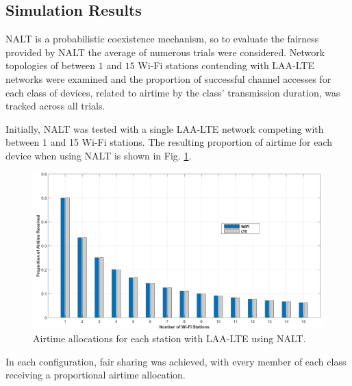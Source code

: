 \subsection{Simulation Results}
\label{sim-results}
NALT is a probabilistic coexistence mechanism, so to evaluate the fairness provided by NALT the average of numerous trials were considered.  Network topologies of between $1$ and $15$ \mbox{Wi-Fi} stations contending with \mbox{LAA-LTE} networks were examined and the proportion of successful channel accesses for each class of devices, related to airtime by the class' transmission duration, was tracked across all trials.  

Initially, NALT was tested with a single LAA-LTE network competing with between 1 and 15 Wi-Fi stations.  The resulting proportion of airtime for each device when using NALT is shown in Fig. \ref{basic-results}.
\begin{figure}[!ht]	
	\includegraphics[width=\textwidth]{figures3/NALT-1-15}
	\caption{Airtime allocations for each station with LAA-LTE using NALT.}
	\label{basic-results}
\end{figure}
In each configuration, fair sharing was achieved, with every member of each class receiving a proportional airtime allocation. 

